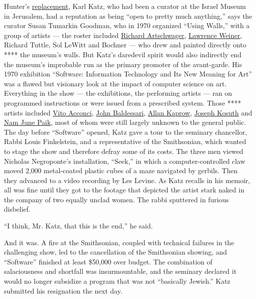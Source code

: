 Hunter's
\href{https://www.nytimes.com/1968/04/03/archives/jewish-museum-finds-its-new-director-brooklynborn-karl-katz-in.html}{replacement},
Karl Katz, who had been a curator at the Israel Museum in Jerusalem, had
a reputation as being ``open to pretty much anything,'' says the curator
Susan Tumarkin Goodman, who in 1970 organized ``Using Walls,'' with a
group of artists --- the roster included
\href{https://www.nytimes.com/2013/02/11/arts/design/richard-artschwager-painter-and-sculptor-dies-at-89.html}{Richard
Artschwager},
\href{https://www.lissongallery.com/artists/lawrence-weiner}{Lawrence
Weiner}, Richard Tuttle, Sol LeWitt and Bochner --- who drew and painted
directly onto **** the museum's walls. But Katz's daredevil spirit would
also indirectly end the museum's improbable run as the primary promoter
of the avant-garde. His 1970 exhibition ``Software: Information
Technology and Its New Meaning for Art'' was a flawed but visionary look
at the impact of computer science on art. Everything in the show --- the
exhibitions, the performing artists --- ran on programmed instructions
or were issued from a prescribed system. Those **** artists included
\href{https://www.nytimes.com/2017/04/28/arts/design/vito-acconci-dead-performance-artist.html}{Vito
Acconci},
\href{https://www.nytimes.com/2020/01/05/arts/john-baldessari-dead.html}{John
Baldessari},
\href{https://www.nytimes.com/2006/04/10/arts/design/allan-kaprow-creator-of-artistic-happenings-dies-at-78.html}{Allan
Kaprow}, \href{https://www.skny.com/artists/joseph-kosuth}{Joseph
Kosuth} and
\href{https://www.nytimes.com/2006/01/31/arts/design/nam-june-paik-73-dies-pioneer-of-video-art-whose-work-broke.html}{Nam
June Paik}, most of whom were still largely unknown to the general
public. The day before ``Software'' opened, Katz gave a tour to the
seminary chancellor, Rabbi Louis Finkelstein, and a representative of
the Smithsonian, which wanted to stage the show and therefore defray
some of its costs. The three men viewed Nicholas Negroponte's
installation, ``Seek,'' in which a computer-controlled claw moved 2,000
metal-coated plastic cubes of a maze navigated by gerbils. Then they
advanced to a video recording by Les Levine. As Katz recalls in his
memoir, all was fine until they got to the footage that depicted the
artist stark naked in the company of two equally unclad women. The rabbi
sputtered in furious disbelief.

``I think, Mr. Katz, that this is the end,'' he said.

And it was. A fire at the Smithsonian, coupled with technical failures
in the challenging show, led to the cancellation of the Smithsonian
showing, and ``Software'' finished at least \$50,000 over budget. The
combination of salaciousness and shortfall was insurmountable, and the
seminary declared it would no longer subsidize a program that was not
``basically Jewish.'' Katz submitted his resignation the next day.


